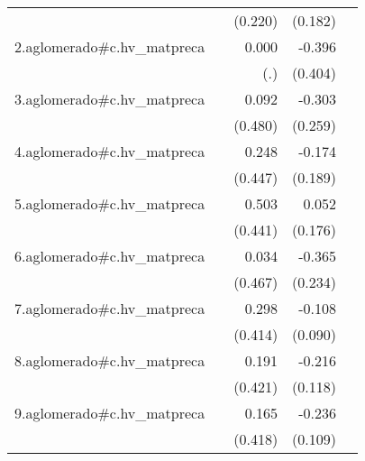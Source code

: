 {\begin{longtable}{l*{4}{D{.}{.}{-1}}}
            &                     &     (0.220)         &     (0.182)         &                     \\
\addlinespace
2.aglomerado#c.hv\_matpreca&                     &       0.000         &      -0.396         &                     \\
            &                     &         (.)         &     (0.404)         &                     \\
\addlinespace
3.aglomerado#c.hv\_matpreca&                     &       0.092         &      -0.303         &                     \\
            &                     &     (0.480)         &     (0.259)         &                     \\
\addlinespace
4.aglomerado#c.hv\_matpreca&                     &       0.248         &      -0.174         &                     \\
            &                     &     (0.447)         &     (0.189)         &                     \\
\addlinespace
5.aglomerado#c.hv\_matpreca&                     &       0.503         &       0.052         &                     \\
            &                     &     (0.441)         &     (0.176)         &                     \\
\addlinespace
6.aglomerado#c.hv\_matpreca&                     &       0.034         &      -0.365         &                     \\
            &                     &     (0.467)         &     (0.234)         &                     \\
\addlinespace
7.aglomerado#c.hv\_matpreca&                     &       0.298         &      -0.108         &                     \\
            &                     &     (0.414)         &     (0.090)         &                     \\
\addlinespace
8.aglomerado#c.hv\_matpreca&                     &       0.191         &      -0.216         &                     \\
            &                     &     (0.421)         &     (0.118)         &                     \\
\addlinespace
9.aglomerado#c.hv\_matpreca&                     &       0.165         &      -0.236\sym{*}  &                     \\
            &                     &     (0.418)         &     (0.109)         &                     \\

\end{longtable}}
